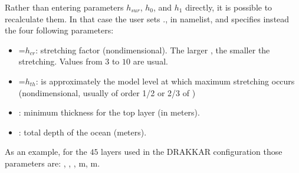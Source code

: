 \documentclass[../tex_main/NEMO_manual]{subfiles}
\begin{document}
Rather than entering parameters $h_{sur}$, $h_{0}$, and $h_{1}$ directly, it is possible to recalculate them.
In that case the user sets \forcode{ = }\forcode{ = }.,
in  namelist, and specifies instead the four following parameters:
\begin{itemize}
\item
  =$h_{cr} $: stretching factor (nondimensional).
  The larger , the smaller the stretching.
  Values from $3$ to $10$ are usual.
\item
  =$h_{th} $: is approximately the model level at which maximum stretching occurs
  (nondimensional, usually of order 1/2 or 2/3 of )
\item
  : minimum thickness for the top layer (in meters).
\item
  : total depth of the ocean (meters).
\end{itemize}
As an example, for the $45$ layers used in the DRAKKAR configuration those parameters are:
, , ,
m, m.
\end{document}
